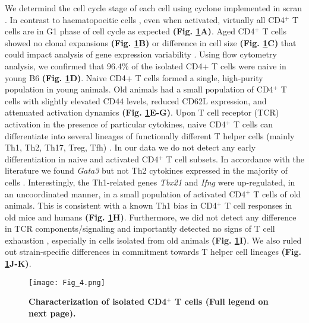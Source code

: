 We determind the cell cycle stage of each cell using cyclone \citep{Scialdone2015} implemented in scran \citep{Lun2016}.
In contrast to haematopoeitic cells \citep{Kowalczyk2015}, even when activated, virtually all CD4$^+$ T cells are in G1 phase of cell cycle as expected \textbf{(Fig. \ref{fig1:characterization}A)}. Aged CD4$^+$ T cells showed no clonal expansions \textbf{(Fig. \ref{fig1:characterization}B)} or difference in cell size \textbf{(Fig. \ref{fig1:characterization}C)} that could impact analysis of gene expression variability \citep{Stubbington2015}. Using flow cytometry analysis, we confirmed that 96.4\% of the isolated CD4+ T cells were naive in young B6 \textbf{(Fig. \ref{fig1:characterization}D)}. Naive CD4+ T cells formed a single, high-purity population in young animals. Old animals had a small population of CD4$^+$ T cells with slightly elevated CD44 levels, reduced CD62L expression, and attenuated activation dynamics \textbf{(Fig. \ref{fig1:characterization}E-G)}. Upon T cell receptor (TCR) activation in the presence of particular cytokines, naive CD4$^+$ T cells can differentiate into several lineages of functionally different T helper cells (mainly Th1, Th2, Th17, Treg, Tfh) \citep{Stubbington2015, Zhu2010}. In our data we do not detect any early differentiation in naive and activated CD4$^+$ T cell subsets. In accordance with the literature we found \textit{Gata3} but not Th2 cytokines expressed in the majority of cells  \citep{Ho2009}. Interestingly, the Th1-related genes \textit{Tbx21} and \textit{Ifng} were up-regulated, in an uncoordinated manner, in a small population of activated CD4$^+$ T cells of old animals. This is consistent with a known Th1 bias in CD4$^+$ T cell responses in old mice \citep{Zhang2014} and humans \citep{Sakata-Kaneko2000} \textbf{(Fig. \ref{fig1:characterization}H)}. Furthermore, we did not detect any difference in TCR components/signaling and importantly detected no signs of T cell exhaustion \citep{Wherry2011}, especially in cells isolated from old animals \textbf{(Fig. \ref{fig1:characterization}I)}. We also ruled out strain-specific differences in commitment towards T helper cell lineages \textbf{(Fig. \ref{fig1:characterization}J-K)}. \\

\begin{figure}[!hb]
\centering
\texttt{[image: Fig\_4.png]}
\caption[Characterization of isolated CD4$^+$ T cells]{\textbf{Characterization of isolated CD4$^+$ T cells (Full legend on next page).}}
\label{fig1:characterization}
\end{figure}

